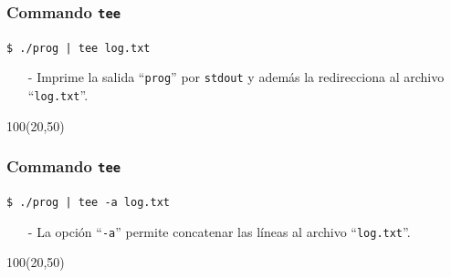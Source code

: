 \documentclass{beamer}
\begin{document}
\begin{frame}[fragile,t]
    \frametitle{Commando \texttt{tee}}
    \begin{block}{\vspace*{-3ex}}
    \texttt{\$}\verb: ./prog | tee log.txt:
    \vspace*{0.5ex}
    \end{block}
    \begin{itemize}
    \item[-] Imprime la salida ``\verb|prog|'' por \verb|stdout| y además la redirecciona al archivo ``\verb|log.txt|''.
    \end{itemize}
    \begin{textblock}{100}(20,50)
    \begin{center}
    \end{center}
    \end{textblock}
\end{frame}

\begin{frame}[fragile,t]
    \frametitle{Commando \texttt{tee}}
    \begin{block}{\vspace*{-3ex}}
    \texttt{\$}\verb: ./prog | tee -a log.txt:
    \vspace*{0.5ex}
    \end{block}
    \begin{itemize}
    \item[-] La opci\'on ``\verb|-a|'' permite concatenar las líneas al archivo ``\verb|log.txt|''.
    \end{itemize}
    \begin{textblock}{100}(20,50)
    \begin{center}
    \end{center}
    \end{textblock}
\end{frame}
\end{document}
